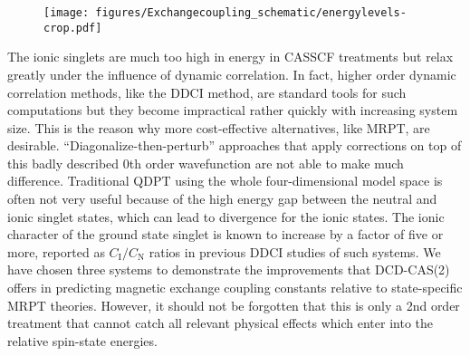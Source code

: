 \begin{figure}
\centering
{}
{\texttt{[image: figures/Exchangecoupling\_schematic/energylevels-crop.pdf]}}
\end{figure}
The ionic singlets are much too high in energy in CASSCF treatments but relax greatly under the influence of dynamic correlation. In fact, higher order dynamic correlation methods, like the DDCI method,\cite{BordaCGIRC_2007_154} are standard tools for such computations but they become impractical rather quickly with increasing system size. This is the reason why more cost-effective alternatives, like MRPT, are desirable. “Diagonalize-then-perturb” approaches that apply corrections on top of this badly described 0th order wavefunction are not able to make much difference. Traditional QDPT using the whole four-dimensional model space is often not very useful because of the high energy gap between the neutral and ionic singlet states, which can lead to divergence for the ionic states.\cite{AngelCCM_2006_234109} The ionic character of the ground state singlet is known to increase by a factor of five or more, reported as $C_\text{I}/C_\text{N}$ ratios in previous DDCI studies of such systems.\cite{CalzaCMC_2002_3985}
We have chosen three systems to demonstrate the improvements that DCD-CAS(2) offers in predicting magnetic exchange coupling constants relative to state-specific MRPT theories. However, it should not be forgotten that this is only a 2nd order treatment that cannot catch all relevant physical effects which enter into the relative spin-state energies.\cite{CalzaCMC_2002_2728} 
